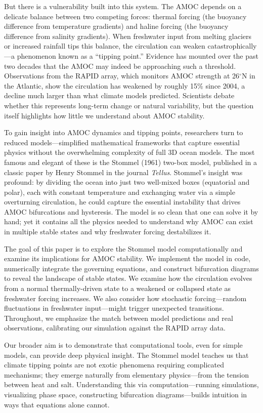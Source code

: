 \documentclass[12pt,letterpaper]{article}
\begin{document}
But there is a vulnerability built into this system. The AMOC depends on a delicate balance between two competing forces: thermal forcing (the buoyancy difference from temperature gradients) and haline forcing (the buoyancy difference from salinity gradients). When freshwater input from melting glaciers or increased rainfall tips this balance, the circulation can weaken catastrophically---a phenomenon known as a ``tipping point.'' Evidence has mounted over the past two decades that the AMOC may indeed be approaching such a threshold. Observations from the RAPID array, which monitors AMOC strength at 26$^\circ$N in the Atlantic, show the circulation has weakened by roughly 15\% since 2004, a decline much larger than what climate models predicted. Scientists debate whether this represents long-term change or natural variability, but the question itself highlights how little we understand about AMOC stability.

To gain insight into AMOC dynamics and tipping points, researchers turn to reduced models---simplified mathematical frameworks that capture essential physics without the overwhelming complexity of full 3D ocean models. The most famous and elegant of these is the Stommel (1961) two-box model, published in a classic paper by Henry Stommel in the journal \textit{Tellus}. Stommel's insight was profound: by dividing the ocean into just two well-mixed boxes (equatorial and polar), each with constant temperature and exchanging water via a simple overturning circulation, he could capture the essential instability that drives AMOC bifurcations and hysteresis. The model is so clean that one can solve it by hand; yet it contains all the physics needed to understand why AMOC can exist in multiple stable states and why freshwater forcing destabilizes it.

The goal of this paper is to explore the Stommel model computationally and examine its implications for AMOC stability. We implement the model in code, numerically integrate the governing equations, and construct bifurcation diagrams to reveal the landscape of stable states. We examine how the circulation evolves from a normal thermally-driven state to a weakened or collapsed state as freshwater forcing increases. We also consider how stochastic forcing---random fluctuations in freshwater input---might trigger unexpected transitions. Throughout, we emphasize the match between model predictions and real observations, calibrating our simulation against the RAPID array data.

Our broader aim is to demonstrate that computational tools, even for simple models, can provide deep physical insight. The Stommel model teaches us that climate tipping points are not exotic phenomena requiring complicated mechanisms; they emerge naturally from elementary physics---from the tension between heat and salt. Understanding this via computation---running simulations, visualizing phase space, constructing bifurcation diagrams---builds intuition in ways that equations alone cannot.
\end{document}
